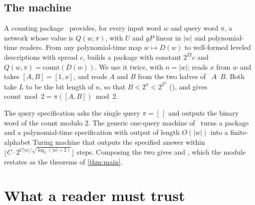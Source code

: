 \documentclass[10pt]{amsart}
\theoremstyle{plain}
\theoremstyle{definition}
\theoremstyle{remark}
\numberwithin{equation}{section}
\begin{document}
\subsection{The machine}
A counting package~\cite[\S4]{TulCN26} provides, for every input word $w$ and query word $\pi$, a network
whose value is $Q(w,\pi)$, with $U$ and $gP$ linear in $|w|$ and polynomial-time readers. From any
polynomial-time map $w\mapsto D(w)$ to well-formed leveled descriptions with spread $c$,
 builds a package with constant $2^{22}c$ and
$Q(w,\pi)=\mathrm{count}(D(w))$. We use it twice, with $n=|w|$:  reads $x$ from $w$ and takes
$[A,B]=[1,x]$, and  reads $A$ and $B$ from the two halves of ~$A$~$B$.
Both take $L$ to be the bit length of $n$, so that $B<2^n<2^{2^L}$ (), and
 gives
$\mathrm{count}\bmod2=\pi([A,B])\bmod2$.

The query specification  asks the single query $\pi=[\,]$ and outputs the binary word of
the count modulo $2$. The generic one-query machine  of~\cite[Thm.~4.1]{TulCN26}
turns a package and a polynomial-time specification with output of length $O(|w|)$ into a finite-alphabet
Turing machine that outputs the specified answer within $\lfloor C\cdot2^{C|w|/\sqrt{\log_2(|w|+2)}}\rfloor$
steps. Composing the two gives  and , which the module
 restates as the theorems of \cref{thm:main}.

\section{What a reader must trust}\label{sec:statement}
\end{document}
